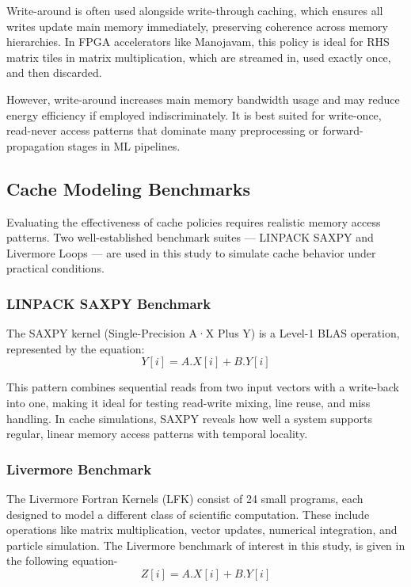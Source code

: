 Write-around is often used alongside write-through caching, which ensures all writes update main memory immediately, preserving coherence across memory hierarchies. In FPGA accelerators like Manojavam, this policy is ideal for RHS matrix tiles in matrix multiplication, which are streamed in, used exactly once, and then discarded\cite{cache-3}.

However, write-around increases main memory bandwidth usage and may reduce energy efficiency if employed indiscriminately. It is best suited for write-once, read-never access patterns that dominate many preprocessing or forward-propagation stages in ML pipelines\cite{cache-4}.

\subsection{Cache Modeling Benchmarks}
Evaluating the effectiveness of cache policies requires realistic memory access patterns. Two well-established benchmark suites — LINPACK SAXPY and Livermore Loops — are used in this study to simulate cache behavior under practical conditions.

\subsubsection{LINPACK SAXPY Benchmark}
The SAXPY kernel (Single-Precision A·X Plus Y) is a Level-1 BLAS operation, represented by the equation:
\begin{equation}
	Y[i] = A.X[i] + B.Y[i]
\end{equation}

This pattern combines sequential reads from two input vectors with a write-back into one, making it ideal for testing read-write mixing, line reuse, and miss handling. In cache simulations, SAXPY reveals how well a system supports regular, linear memory access patterns with temporal locality\cite{cache-5}.

\subsubsection{Livermore Benchmark}
The Livermore Fortran Kernels (LFK) consist of 24 small programs, each designed to model a different class of scientific computation. These include operations like matrix multiplication, vector updates, numerical integration, and particle simulation. The Livermore benchmark of interest in this study, is given in the following equation-
\begin{equation}
	Z[i] = A.X[i] + B.Y[i]
\end{equation}

